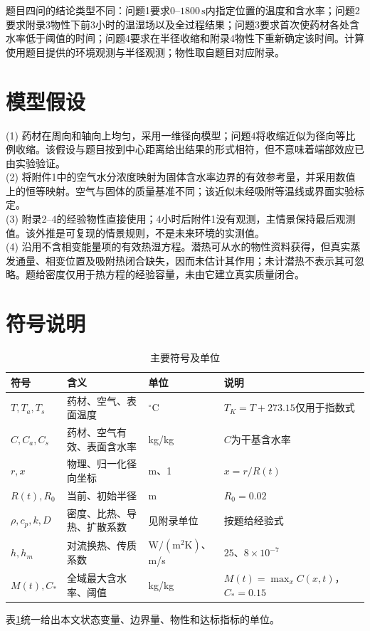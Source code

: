 \documentclass[UTF8,zihao=-4,a4paper]{ctexart}
\begin{document}
题目四问的结论类型不同：问题1要求$0$--$1800\,\mathrm s$内指定位置的温度和含水率；问题2要求附录3物性下前3小时的温湿场以及全过程结果；问题3要求首次使药材各处含水率低于阈值的时间；问题4要求在半径收缩和附录4物性下重新确定该时间。计算使用题目提供的环境观测与半径观测；物性取自题目对应附录。



\section{模型假设}

(1) 药材在周向和轴向上均匀，采用一维径向模型；问题4将收缩近似为径向等比例收缩。该假设与题目按到中心距离给出结果的形式相符，但不意味着端部效应已由实验验证。\\
(2) 将附件1中的空气水分浓度映射为固体含水率边界的有效参考量，并采用数值上的恒等映射。空气与固体的质量基准不同；该近似未经吸附等温线或界面实验标定。\\
(3) 附录2--4的经验物性直接使用；4小时后附件1没有观测，主情景保持最后观测值。该外推是可复现的情景规则，不是未来环境的实测值。\\
(4) 沿用不含相变能量项的有效热湿方程。潜热可从水的物性资料获得，但真实蒸发通量、相变位置及吸附热闭合缺失，因而未估计其作用；未计潜热不表示其可忽略。题给密度仅用于热方程的经验容量，未由它建立真实质量闭合。

\section{符号说明}
\begin{table}[H]\centering\small\caption{主要符号及单位}\label{tab:symbols}
\begin{tabular}{p{}p{}p{}p{}}
\toprule
符号&含义&单位&说明\\
\midrule
$T,T_a,T_s$&药材、空气、表面温度&$^{\circ}\mathrm C$&$T_K=T+273.15$仅用于指数式\\
$C,C_a,C_s$&药材、空气有效、表面含水率&kg/kg&$C$为干基含水率\\
$r,x$&物理、归一化径向坐标&m、1&$x=r/R(t)$\\
$R(t),R_0$&当前、初始半径&m&$R_0=0.02$\\
$\rho,c_p,k,D$&密度、比热、导热、扩散系数&见附录单位&按题给经验式\\
$h,h_m$&对流换热、传质系数&$\mathrm{W/(m^2K)}$、m/s&$25$、$8\times10^{-7}$\\
$M(t),C_*$&全域最大含水率、阈值&kg/kg&$M(t)=\max_xC(x,t)$，$C_*=0.15$\\
\bottomrule
\end{tabular}\end{table}
表\ref{tab:symbols}统一给出本文状态变量、边界量、物性和达标指标的单位。
\end{document}
